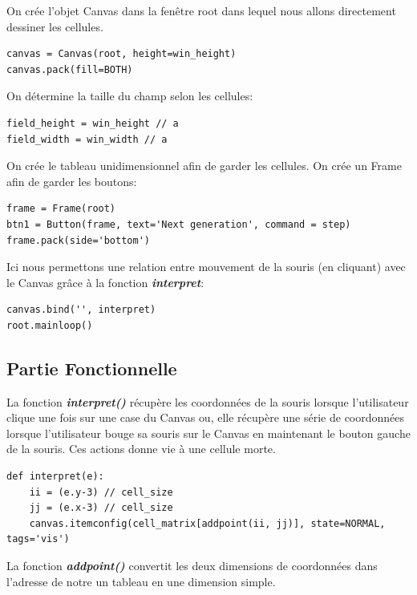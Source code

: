 \documentclass{article}
\begin{document}
\noindent On crée l'objet Canvas dans la fenêtre root dans lequel nous allons directement dessiner les cellules.

\begin{verbatim}
canvas = Canvas(root, height=win_height)
canvas.pack(fill=BOTH)
\end{verbatim}

\noindent On détermine la taille du champ selon les cellules:

\begin{verbatim}
field_height = win_height // a
field_width = win_width // a
\end{verbatim}

\noindent On crée le tableau unidimensionnel afin de garder les cellules.
\noindent On crée un Frame afin de garder les boutons:

\begin{verbatim}
frame = Frame(root)
btn1 = Button(frame, text='Next generation', command = step) 
frame.pack(side='bottom')
\end{verbatim}

\noindent Ici nous permettons une relation entre mouvement de la souris (en cliquant) avec le Canvas grâce à la fonction \textbf{\textit{interpret}}:

\begin{verbatim}
canvas.bind('', interpret)
root.mainloop()
\end{verbatim}

\subsection{Partie Fonctionnelle}

\noindent La fonction \textbf{\textit{interpret()}} récupère les coordonnées de la souris lorsque l'utilisateur clique une fois sur une case du Canvas ou, elle récupère une série de coordonnées lorsque l'utilisateur bouge sa souris sur le Canvas en maintenant le bouton gauche de la souris. Ces actions donne vie à une cellule morte.

\begin{verbatim}
def interpret(e):   
    ii = (e.y-3) // cell_size
    jj = (e.x-3) // cell_size
    canvas.itemconfig(cell_matrix[addpoint(ii, jj)], state=NORMAL, tags='vis')
\end{verbatim}

\vspace{3mm}

\noindent La fonction \textbf{\textit{addpoint()}} convertit les deux dimensions de coordonnées dans l'adresse de notre un tableau en une dimension simple.
\end{document}
